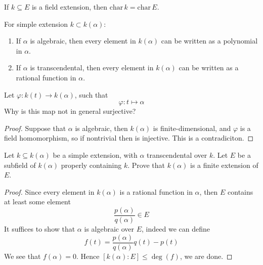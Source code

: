 \documentclass[openany]{book}
\begin{document}


\begin{prop}
    If \( k \subseteq E \) is a field extension, then \(\text{char}\, k = \text{char}\, E\).
\end{prop}

\begin{prop}
    For simple extension $k\subset k(\alpha)$:
    \begin{enumerate}
        \item If $\alpha$ is algebraic, then every element in $k(\alpha)$ can be written as a polynomial in $\alpha$.
        \item If $\alpha$ is transcendental, then every element in $k(\alpha)$ can be written as a rational function in $\alpha$.
    \end{enumerate}
\end{prop}


\begin{prob}
    Let $\varphi: k(t)\to k(\alpha)$, such that 
    \begin{equation*}
        \varphi: t\mapsto \alpha
    \end{equation*}
    Why is this map not in general surjective?
\end{prob}
\begin{proof}
    Suppose that $\alpha$ is algebraic, then $k(\alpha)$ is finite-dimensional, and $\varphi$ is a field homomorphism, so if nontrivial then is injective. This is a contradiciton.
\end{proof}


\begin{prob}
Let \( k \subseteq k(\alpha) \) be a simple extension, with \(\alpha\) transcendental over \(k\). Let \( E \) be a subfield of \( k(\alpha) \) properly containing \(k\). Prove that \( k(\alpha) \) is a finite extension of \(E\).
\end{prob}
\begin{proof}
    Since every element in $k(\alpha)$ is a rational function in $\alpha$, then $E$ contains at least some element 
    \begin{equation*}
        \frac{p(\alpha)}{q(\alpha)}\in E
    \end{equation*}
    It suffices to show that $\alpha$ is algebraic over $E$, indeed we can define 
    \begin{equation*}
        f(t)=\frac{p(\alpha)}{q(\alpha)}q(t)-p(t)
    \end{equation*}
    We see that $f(\alpha)=0$. Hence $[k(\alpha):E]\leq\deg(f)$, we are done.
\end{proof}
\end{document}
